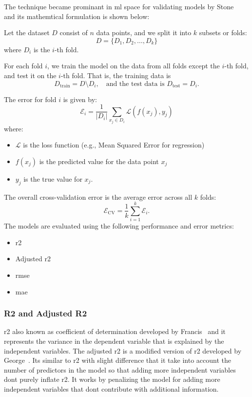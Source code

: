 The technique became prominant in \ac{ml} space for validating models by Stone~\citep{stone1974cross} and its mathemtical formulation is shown below:

Let the dataset \( D \) consist of \( n \) data points, and we split it into \( k \) subsets or folds: 
\begin{equation}
    D = \{D_1, D_2, \dots, D_k\}
\end{equation}
where \( D_i \) is the \( i \)-th fold. 

For each fold \( i \), we train the model on the data from all folds except the \( i \)-th fold, and test it on the \( i \)-th fold. That is, the training data is 
\begin{equation}
    D_{\text{train}} = D \setminus D_i, \quad \text{and the test data is } D_{\text{test}} = D_i.
\end{equation}

The error for fold \( i \) is given by:
\begin{equation}
    \mathcal{E}_i = \frac{1}{|D_i|} \sum_{x_j \in D_i} \mathcal{L}(f(x_j), y_j)
\end{equation}
where:
\begin{itemize}
    \item \( \mathcal{L} \) is the loss function (e.g., Mean Squared Error for regression)
    \item \( f(x_j) \) is the predicted value for the data point \( x_j \)
    \item \( y_j \) is the true value for \( x_j \).
\end{itemize}

The overall cross-validation error is the average error across all \( k \) folds:
\begin{equation}
    \mathcal{E}_{\text{CV}} = \frac{1}{k} \sum_{i=1}^{k} \mathcal{E}_i.
\end{equation}
\clearpage
The models are evaluated using the following performance and error metrics: 
\begin{itemize}
    \item \ac{r2}
    \item Adjusted \ac{r2}
    \item \ac{rmse} 
    \item \ac{mae}
\end{itemize}

\subsubsection{R2 and Adjusted R2}\label{sec:r2_and_adjusted_r2}
\ac{r2} also known as coefficient of determination developed by Francis~\citep{galton1886regression} and it represents the variance in the dependent variable 
that is explained by the independent variables. The adjusted \ac{r2} is a modified version of \ac{r2} developed by George~\citep{mcnemar1978statistical}. Its similar to 
\ac{r2} with slight difference that it take into account the number of predictors in the model so that 
adding more independent variables dont purely inflate \ac{r2}. It works by penalizing the model for adding more independent variables 
that dont contribute with additional information. 

